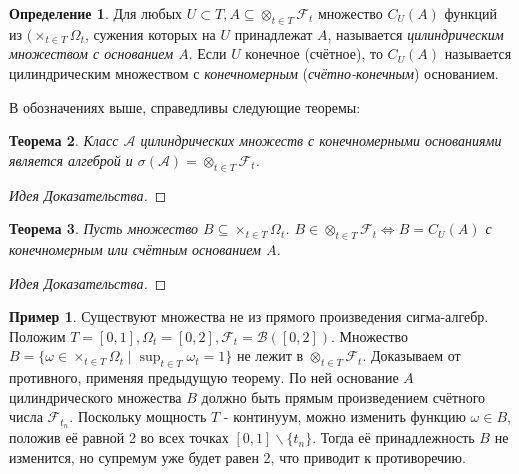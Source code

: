 \documentclass[16pt]{article}
\newtheorem{theorem}{Теорема}[section]
\theoremstyle{definition}
\newtheorem{definition}[theorem]{Определение}
\newtheorem{example}{Пример}[theorem]
\begin{document}
\begin{definition}
Для любых $U \subset T, A \subseteq \otimes_{t \in T}\mathcal{F}_t$ множество $C_U(A)$ функций из $(\times_{t \in T}\Omega_t$, сужения которых на $U$ принадлежат $A$, называется \textit{цилиндрическим множеством с основанием $A$}. Если $U$ конечное (счётное), то $C_U(A)$ называется цилиндрическим множеством с \textit{конечномерным} (\textit{счётно-конечным}) основанием.
\end{definition}
В обозначениях выше, справедливы следующие теоремы:
\begin{theorem}
Класс $\mathcal{A}$ цилиндрических множеств с конечномерными основаниями является алгеброй и $\sigma(\mathcal{A}) = \otimes_{t \in T}\mathcal{F}_t$.
\end{theorem}
\begin{proof}[Идея Доказательства]

\end{proof}
\begin{theorem}
Пусть множество $B \subseteq \times_{t \in T}\Omega_t$. \newline $B \in \otimes_{t \in T}\mathcal{F}_t \Longleftrightarrow B = C_U(A)$ с конечномерным или счётным основанием $A$.
\end{theorem}
\begin{proof}[Идея Доказательства]

\end{proof}
\begin{example}
Существуют множества не из прямого произведения сигма-алгебр. Положим $T = [0, 1], \Omega_t = [0, 2], \mathcal{F}_t = \mathcal{B}([0, 2])$. Множество $B = \{\omega \in \times_{t \in T}\Omega_t \mid \sup_{t \in T}\omega_t = 1\}$ не лежит в $\otimes_{t \in T}\mathcal{F}_t$. Доказываем от противного, применяя предыдущую теорему. По ней основание $A$ цилиндрического множества $B$ должно быть прямым произведением счётного числа $\mathcal{F}_{t_n}$. Поскольку мощность $T$ - континуум, можно изменить функцию $\omega \in B$, положив её равной 2 во всех точках $[0, 1] \backslash \{t_n\}$. Тогда её принадлежность $B$ не изменится, но супремум уже будет равен 2, что приводит к противоречию.
\end{example}
\end{document}

